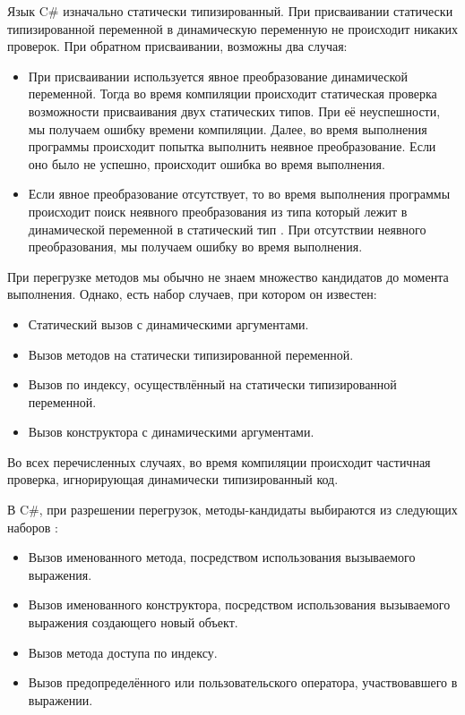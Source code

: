 Язык C\# изначально статически типизированный. При присваивании статически типизированной переменной в динамическую переменную не происходит никаких проверок. При обратном присваивании, возможны два случая:
\begin{itemize}
    \item При присваивании используется  явное преобразование динамической переменной. Тогда во время компиляции происходит статическая проверка возможности присваивания двух статических типов. При её неуспешности, мы получаем ошибку времени компиляции. Далее, во время выполнения программы происходит попытка выполнить неявное преобразование. Если оно было не успешно, происходит ошибка во время выполнения. 
    \item Если явное преобразование отсутствует, то во время выполнения программы происходит поиск неявного преобразования из типа который лежит в динамической переменной в статический тип \cite{csharp:languageSpecification}. При отсутствии неявного преобразования, мы получаем ошибку во время выполнения. 
\end{itemize}



При перегрузке методов мы обычно не знаем множество кандидатов до момента выполнения. Однако, есть набор случаев, при котором он известен:
\begin{itemize}
    \item Статический вызов с динамическими аргументами.
    \item Вызов методов на статически типизированной переменной. 
    \item Вызов по индексу, осуществлённый на статически типизированной переменной. 
    \item Вызов конструктора с динамическими аргументами. 
\end{itemize}
Во всех перечисленных случаях, во время компиляции происходит частичная проверка, игнорирующая динамически типизированный код. 

В C{\#}, при разрешении перегрузок, методы-кандидаты выбираются из следующих наборов \cite{csharp:languageSpecification}:

\begin{itemize}
    \item Вызов именованного метода, посредством использования вызываемого выражения.
    \item Вызов именованного конструктора, посредством использования вызываемого выражения создающего новый объект.
    \item Вызов метода доступа по индексу.
    \item Вызов предопределённого или пользовательского оператора, участвовавшего в выражении.
\end{itemize}

